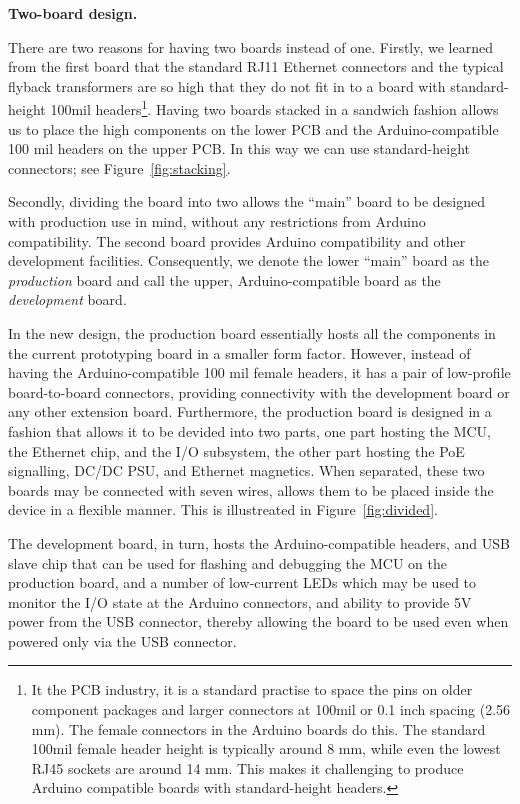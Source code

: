 \documentclass[draft,a4paper]{siamltex}
\begin{document}
{\bf Two-board design.}

There are two reasons for having two boards instead of one.  Firstly,
we learned from the first board that the standard RJ11 Ethernet
connectors and the typical flyback transformers are so high that they
do not fit in to a board with standard-height 100mil
headers\footnote{It the PCB industry, it is a standard practise to
  space the pins on older component packages and larger connectors at
  100mil or 0.1 inch spacing (2.56 mm).  The female connectors in the Arduino
  boards do this.  The standard 100mil female header height is
  typically around 8 mm, while even the lowest RJ45 sockets
  are around 14 mm.  This makes it challenging to produce Arduino
  compatible boards with standard-height headers.}.
Having two boards stacked in a sandwich fashion allows us to place the
high components on the lower PCB and the Arduino-compatible 100 mil
headers on the upper PCB.  In this way we can use standard-height
connectors; see Figure~\ref{fig:stacking}.

Secondly, dividing the board into two allows the ``main'' board to be
designed with production use in mind, without any restrictions from
Arduino compatibility.  The second board provides Arduino
compatibility and other development facilities.  Consequently, we denote
the lower ``main'' board as the {\it production} board and call the
upper, Arduino-compatible board as the {\it development} board.

In the new design, the production board essentially hosts all the
components in the current prototyping board in a smaller form factor.
However, instead of having the Arduino-compatible 100 mil female
headers, it has a pair of low-profile board-to-board connectors,
providing connectivity with the development board or any other
extension board.  Furthermore, the production board is designed in a
fashion that allows it to be devided into two parts, one part hosting
the MCU, the Ethernet chip, and the I/O subsystem, the other part hosting the
PoE signalling, DC/DC PSU, and Ethernet magnetics.  When separated,
these two boards may be connected with seven wires, allows them to be
placed inside the device in a flexible manner.  This is illustreated
in Figure~\ref{fig:divided}.

The development board, in turn, hosts the Arduino-compatible headers,
and USB slave chip that can be used for flashing and debugging the MCU
on the production board, and a number of low-current LEDs which may be
used to monitor the I/O state at the Arduino connectors, and ability
to provide 5V power from the USB connector, thereby allowing the board
to be used even when powered only via the USB connector.
\end{document}
